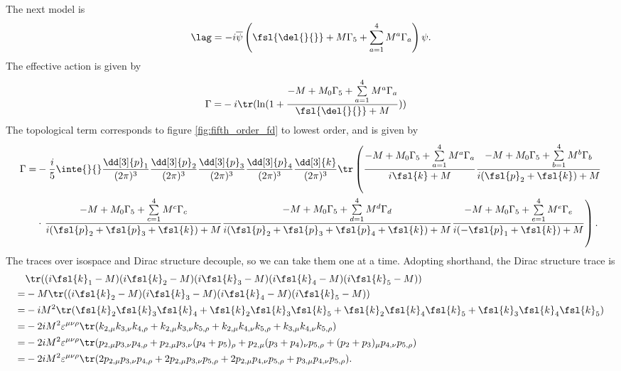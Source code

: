 The next model is
\begin{align*}
	\lag = -i\overline{\psi}\left(\fsl{\del{}{}} + M\Gamma_{5} + \sum\limits_{a = 1}^{4}M^{a}\Gamma_{a}\right)\psi.
\end{align*}
The effective action is given by
\begin{align*}
	\Gamma =& -i\tr(\ln(1 + \frac{-M + M_{0}\Gamma_{5} + \sum\limits_{a = 1}^{4}M^{a}\Gamma_{a}}{\fsl{\del{}{}} + M}))
\end{align*}
The topological term corresponds to figure \ref{fig:fifth_order_fd} to lowest order, and is given by
\begin{align*}
	\Gamma =& -\frac{i}{5}\inte{}{}\frac{\dd[3]{p}_{1}}{(2\pi)^{3}}\frac{\dd[3]{p}_{2}}{(2\pi)^{3}}\frac{\dd[3]{p}_{3}}{(2\pi)^{3}}\frac{\dd[3]{p}_{4}}{(2\pi)^{3}}\frac{\dd[3]{k}}{(2\pi)^{3}}\tr\left(\frac{-M + M_{0}\Gamma_{5} + \sum\limits_{a = 1}^{4}M^{a}\Gamma_{a}}{i\fsl{k} + M}\frac{-M + M_{0}\Gamma_{5} + \sum\limits_{b = 1}^{4}M^{b}\Gamma_{b}}{i(\fsl{p}_{2} + \fsl{k}) + M} \right. \\
	&\cdot\left.\frac{-M + M_{0}\Gamma_{5} + \sum\limits_{c = 1}^{4}M^{c}\Gamma_{c}}{i(\fsl{p}_{2} + \fsl{p}_{3} + \fsl{k}) + M}\frac{-M + M_{0}\Gamma_{5} + \sum\limits_{d = 1}^{4}M^{d}\Gamma_{d}}{i(\fsl{p}_{2} + \fsl{p}_{3} + \fsl{p}_{4} + \fsl{k}) + M}\frac{-M + M_{0}\Gamma_{5} + \sum\limits_{e = 1}^{4}M^{e}\Gamma_{e}}{i(-\fsl{p}_{1} + \fsl{k}) + M}\right).
\end{align*}
The traces over isospace and Dirac structure decouple, so we can take them one at a time. Adopting shorthand, the Dirac structure trace is
\begin{align*}
	 &\tr((i\fsl{k}_{1} - M)(i\fsl{k}_{2} - M)(i\fsl{k}_{3} - M)(i\fsl{k}_{4} - M)(i\fsl{k}_{5} - M)) \\
	=& -M\tr((i\fsl{k}_{2} - M)(i\fsl{k}_{3} - M)(i\fsl{k}_{4} - M)(i\fsl{k}_{5} - M)) \\
	=& -iM^{2}\tr(\fsl{k}_{2}\fsl{k}_{3}\fsl{k}_{4} + \fsl{k}_{2}\fsl{k}_{3}\fsl{k}_{5} + \fsl{k}_{2}\fsl{k}_{4}\fsl{k}_{5} + \fsl{k}_{3}\fsl{k}_{4}\fsl{k}_{5}) \\
	=& -2iM^{2}\varepsilon^{\mu\nu\rho}\tr(k_{2, \mu}k_{3, \nu}k_{4, \rho} + k_{2, \mu}k_{3, \nu}k_{5, \rho} + k_{2, \mu}k_{4, \nu}k_{5, \rho} + k_{3, \mu}k_{4, \nu}k_{5, \rho}) \\
	=& -2iM^{2}\varepsilon^{\mu\nu\rho}\tr(p_{2, \mu}p_{3, \nu}p_{4, \rho} + p_{2, \mu}p_{3, \nu}(p_{4} + p_{5})_{\rho} + p_{2, \mu}(p_{3} + p_{4})_{\nu}p_{5, \rho} + (p_{2} + p_{3})_{\mu}p_{4, \nu}p_{5, \rho}) \\
	=& -2iM^{2}\varepsilon^{\mu\nu\rho}\tr(2p_{2, \mu}p_{3, \nu}p_{4, \rho} + 2p_{2, \mu}p_{3, \nu}p_{5, \rho} + 2p_{2, \mu}p_{4, \nu}p_{5, \rho} + p_{3, \mu}p_{4, \nu}p_{5, \rho}).
\end{align*}

